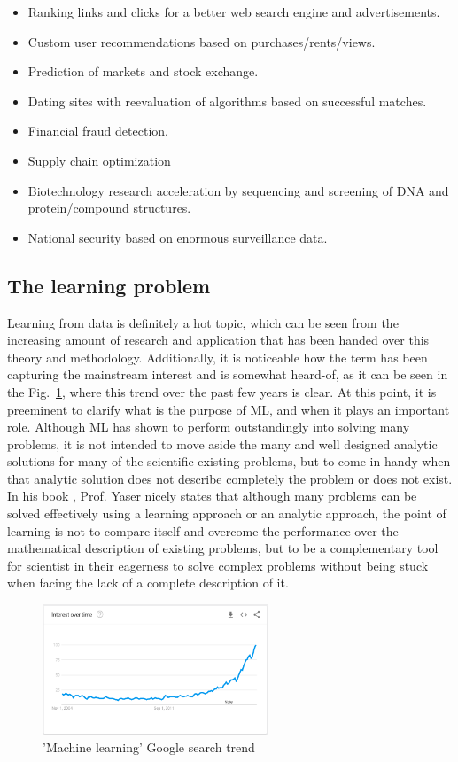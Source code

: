 \begin{itemize}
    \item Ranking links and clicks for a better web search engine and advertisements.
    \item Custom user recommendations based on purchases/rents/views.
    \item Prediction of markets and stock exchange.
    \item Dating sites with reevaluation of algorithms based on successful matches.
    \item Financial fraud detection.
    \item Supply chain optimization
    \item Biotechnology research acceleration by sequencing and screening of DNA and protein/compound structures.
    \item National security based on enormous surveillance data.
\end{itemize}

\subsection{The learning problem}
Learning from data is definitely a hot topic, which can be seen from the increasing amount of research and application that has been handed over this theory and methodology. Additionally, it is noticeable how the term has been capturing the mainstream interest and is somewhat heard-of, as it can be seen in the Fig.~\ref{fig:ml_trend}, where this trend over the past few years is clear. At this point, it is preeminent to clarify what is the purpose of \ac{ML}, and when it plays an important role. Although \ac{ML} has shown to perform outstandingly into solving many problems, it is not intended to move aside the many and well designed analytic solutions for many of the scientific existing problems, but to come in handy when that analytic solution does not describe completely the problem or does not exist. In his book \cite{Yaser}, Prof. Yaser nicely states that although many problems can be solved effectively using a learning approach or an analytic approach, the point of learning is not to compare itself and overcome the performance over the mathematical description of existing problems, but to be a complementary tool for scientist in their eagerness to solve complex problems without being stuck when facing the lack of a complete description of it.

\begin{figure}[htb]
    \centering
      \includegraphics[width=0.6\textwidth]{figures/ml_trend.png}
      \caption{'Machine learning' Google search trend \cite{GoogleInc.2017}}
      \label{fig:ml_trend}
\end{figure}

